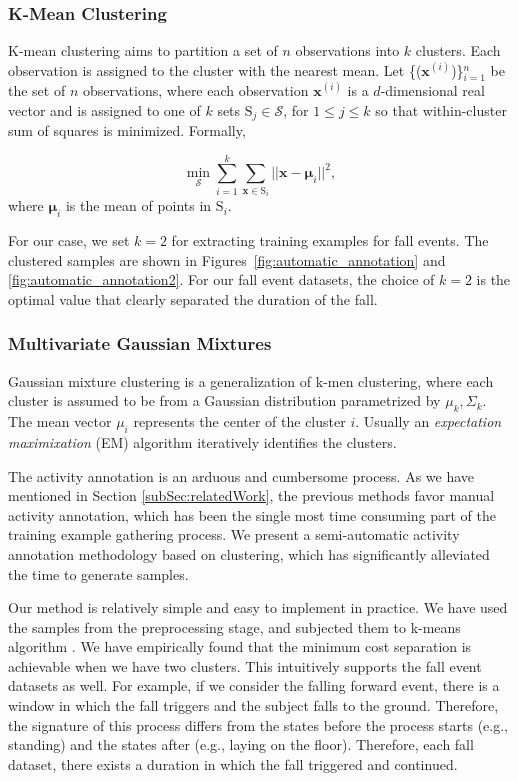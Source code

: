 \documentclass{IEEEtran}
\begin{document}
\subsubsection{K-Mean Clustering}
K-mean clustering aims to partition a set of $n$ observations into $k$ clusters. Each 
observation is assigned to the cluster with the nearest mean. Let 
\{($\mathbf{x}^{(i)}$)\}$_{i=1}^n$  be the set of $n$ 
observations, where each observation $\mathbf{x}^{(i)}$ is a $d$-dimensional real vector 
and is 
assigned to one of $k$ sets $\mathrm{S}_j \in \mathcal{S}$, for $ 1 \leq  j \leq k$ so 
that 
within-cluster 
sum of squares is minimized. Formally,

$$ \min _{\mathcal{S}} \sum_{i=1}^{k} \sum_{\mathbf{x} \in \mathrm{S}_i} || \mathbf{x} - 
\boldsymbol{\mu}_i 
||^2,$$
where $\boldsymbol{\mu}_i $ is the mean of points in $\mathrm{S}_i$.

For our case, we set $k = 2$ for extracting  training examples for fall events. The 
clustered samples are shown in Figures~\ref{fig:automatic_annotation} and 
\ref{fig:automatic_annotation2}. For our fall event datasets, the choice of $k=2$ is the 
optimal value that clearly separated the duration of the fall. 


\subsubsection{Multivariate Gaussian Mixtures}

Gaussian mixture clustering is a generalization of k-men clustering, where each cluster is assumed to be from a Gaussian distribution parametrized by $\mu_k, \Sigma_k$. The mean vector $\mu_i$ represents the center of the cluster $i$. Usually an \emph{expectation maximixation} (EM) algorithm iteratively identifies the clusters.
 

The activity annotation is an arduous and cumbersome process. As we have mentioned in 
Section \ref{subSec:relatedWork}, the previous methods favor manual activity annotation, 
which has been the single most time consuming part of the training example gathering 
process. We present a semi-automatic activity annotation methodology based on 
clustering, which has 
significantly alleviated the time to generate samples. 

Our method is relatively simple and easy to implement in practice. We have used the 
samples from the preprocessing stage, and subjected them to k-means algorithm 
\cite{Bishop06a}. We have empirically found that the minimum cost separation is 
achievable when we have two clusters. This intuitively supports the fall event datasets 
as well. For 
example, if we consider the falling forward event, there is a window in which the fall 
triggers and the subject falls to the ground. Therefore, the signature of this process 
differs from the states before the process starts (e.g., standing) and the states after 
(e.g., laying on the floor). Therefore, each fall dataset, there exists a duration in 
which the fall triggered and continued.
\end{document}

